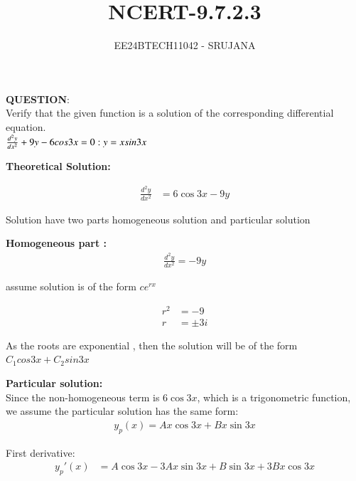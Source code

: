 \documentclass[journal]{IEEEtran}
\begin{document}

\vspace{3cm}

\title{NCERT-9.7.2.3}
\author{EE24BTECH11042 - SRUJANA}
{\let\newpage\relax\maketitle}

\renewcommand{\thefigure}{\theenumi}
\renewcommand{\thetable}{\theenumi}
\setlength{\intextsep}{10pt} 

\renewcommand{\thetable}{\theenumi}

\textbf{QUESTION}:\\

Verify that the given function is a solution of the corresponding differential equation.\\

$\frac{d^2y}{dx^2}+9y-6cos3x = 0  :  y = xsin3x\\$

\textbf{Theoretical Solution:\\}

\begin{align}
   \frac{d^2y}{dx^2} &= 6 \cos{3x} -9y 
\end{align}

Solution have two parts homogeneous solution and particular solution

\textbf{Homogeneous part :}
\begin{align}
    \frac{d^2y}{dx^2} = -9y
\end{align}

assume solution is of the form $ce^{rx}$

\begin{align}
    r^2 &= -9\\
    r &= \pm 3i
\end{align}

As the roots are exponential  , then the solution will be of the form $C_1cos3x + C_2sin3x$

\textbf{Particular solution:}\\

Since the non-homogeneous term is \( 6 \cos 3x \), which is a trigonometric function, we assume the particular solution has the same form:
\begin{align}
   y_p(x) = A x \cos 3x + B x \sin 3x
\end{align}

First derivative:
\begin{align}
    y_p'(x) &= A \cos 3x - 3Ax \sin 3x + B \sin 3x + 3Bx \cos 3x 
\end{align}
\end{document}
